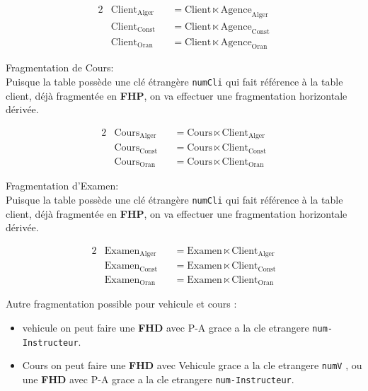 \documentclass{article}
\begin{document}
\begin{alignat*}{2}
    &\text{Client}_{\text{Alger}} &&= \text{Client} \ltimes \text{Agence}_{\text{Alger}}\\[0.1cm]
    &\text{Client}_{\text{Const}} &&= \text{Client} \ltimes \text{Agence}_{\text{Const}}\\[0.1cm]
    &\text{Client}_{\text{Oran}} &&= \text{Client} \ltimes \text{Agence}_{\text{Oran}}
\end{alignat*}


\vspace{0.25cm}
Fragmentation de Cours:\\[0.1cm]
Puisque la table possède une clé étrangère \texttt{numCli} qui fait référence à la table client, déjà fragmentée en
\textbf{FHP}, on va effectuer une fragmentation horizontale dérivée.

\begin{alignat*}{2}
    &\text{Cours}_{\text{Alger}} &&= \text{Cours} \ltimes \text{Client}_{\text{Alger}}\\[0.1cm]
    &\text{Cours}_{\text{Const}} &&= \text{Cours} \ltimes \text{Client}_{\text{Const}}\\[0.1cm]
    &\text{Cours}_{\text{Oran}} &&= \text{Cours} \ltimes \text{Client}_{\text{Oran}}
\end{alignat*}



\vspace{0.25cm}
Fragmentation d'Examen:\\[0.1cm]
Puisque la table possède une clé étrangère \texttt{numCli} qui fait référence à la table client, déjà fragmentée en
\textbf{FHP}, on va effectuer une fragmentation horizontale dérivée.

\begin{alignat*}{2}
    &\text{Examen}_{\text{Alger}} &&= \text{Examen} \ltimes \text{Client}_{\text{Alger}}\\[0.1cm]
    &\text{Examen}_{\text{Const}} &&= \text{Examen} \ltimes \text{Client}_{\text{Const}}\\[0.1cm]
    &\text{Examen}_{\text{Oran}} &&= \text{Examen} \ltimes \text{Client}_{\text{Oran}}
\end{alignat*}




\newpage
Autre fragmentation possible pour vehicule et cours :
\begin{itemize}
    \item vehicule on peut faire une \textbf{FHD} avec P-A grace a la cle etrangere \texttt{num-Instructeur}.
    \item Cours on peut faire une \textbf{FHD} avec Vehicule grace a la cle etrangere \texttt{numV} , ou une \textbf{FHD}
        avec P-A grace a la cle etrangere \texttt{num-Instructeur}.
\end{itemize}
\end{document}
